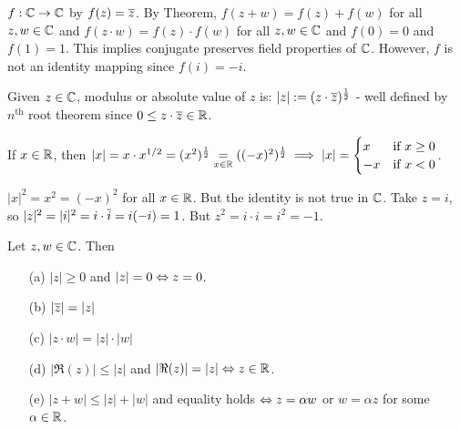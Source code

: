 \documentclass[]{article}
\begin{document}
\begin{remark}
	$f:\mathbb{C}\rightarrow \mathbb{C}$ by $f(z) = \overline{z}$. By Theorem, $f(z+w) = f(z)+f(w)$ for all $z,w\in\mathbb{C}$ and $f(z\cdot w) = f(z)\cdot f(w)$ for all $z,w\in\mathbb{C}$ and $f(0) = 0$ and $f(1) = 1$. This implies conjugate preserves field properties of $\mathbb{C}$. However, $f$ is not an identity mapping since $f(i) = -i$.
\end{remark}
\begin{definition}
	 Given $z\in\mathbb{C}$, modulus or absolute value of $z$ is: $|z|:=(z\cdot \overline{z})^\frac{1}{2}$ - well defined by $n^\text{th}$ root theorem since $0\leq z\cdot \overline{z}\in \mathbb{R}$.
\end{definition}
\begin{note}
	If $x\in\mathbb{R}$, then $|x| = x\cdot x^{1/2} = (x^2)^\frac{1}{2} \underset{x\in\mathbb{R}}{=} ((-x)^2)^\frac{1}{2} \implies |x| = \begin{cases} x & \text{if } x\geq 0\\ -x & \text{if } x<0\end{cases}$.
\end{note}
\begin{observe}
	$|x|^2 = x^2 = (-x)^2$ for all $x\in\mathbb{R}$. But the identity is not true in $\mathbb{C}$. Take $z = i$, so $|z|^2 = |i|^2 = i\cdot\overline{i} = i(-i) = 1$. But $z^2 = i\cdot i = i^2 = -1$.
\end{observe}
\begin{theorem}
	Let $z,w\in\mathbb{C}$. Then
	\begin{enumerate}
		\item[(a)] $|z|\geq 0$ and $|z|= 0 \Leftrightarrow z= 0$.
		\item[(b)] $|\overline{z}| = |z|$
		\item[(c)] $|z\cdot w| = |z|\cdot|w|$
		\item[(d)] $|\Re (z)| \leq |z|$ and $|\Re(z)|=|z|\Leftrightarrow z\in\mathbb{R}$.
		\item[(e)] $|z+w|\leq |z|+|w|$ and equality holds $\Leftrightarrow z = \alpha w$ or $w = \alpha z$ for some $\alpha\in\mathbb{R}$.
	\end{enumerate}
\end{theorem}
\end{document}
